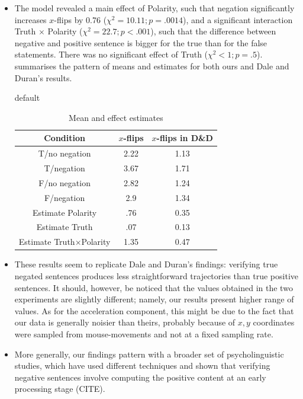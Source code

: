 \documentclass{article}
\begin{document}
\begin{itemize}
\item The model revealed a main effect of Polarity, such that negation significantly increases $x$-flips by 0.76 ($\chi^{2}=10.11; p=.0014$), and a significant interaction Truth $\times$ Polarity ($\chi^{2}=22.7; p<.001$), such that the difference between negative and positive sentence is bigger for the true than for the false statements. There was no significant effect of Truth ($\chi^{2}<1; p=.5$). 
 summarises the pattern of means and estimates for both ours and Dale and Duran's results. 

\begin{table}[h]
\caption{default}
\begin{center}
\begin{tabular}{ccc}
Condition & $x$-flips &  $x$-flips in D\&D \\
\hline
T/no negation & 2.22 & 1.13 \\
T/negation & 3.67 & 1.71 \\
F/no negation & 2.82 & 1.24 \\
F/negation & 2.9 & 1.34 \\
Estimate Polarity & .76 & 0.35 \\
Estimate Truth & .07 & 0.13 \\
Estimate Truth$\times$Polarity & 1.35 & 0.47\\
\end{tabular}
\caption{Mean and effect estimates}
\label{table:negationresults}
\end{center}
\label{default}
\end{table}%

\item These results seem to replicate Dale and Duran's findings: verifying true negated sentences produces less straightforward trajectories than true positive sentences. It should, however, be noticed that the values obtained in the two experiments are slightly different; namely, our results present higher range of values. As for the acceleration component, this might be due to the fact that our data is generally noisier than theirs, probably because of $x,y$ coordinates were sampled from mouse-movements and not at a fixed sampling rate.

\item More generally, our findings pattern with a broader set of psycholinguistic studies, which have used different techniques and shown that verifying negative sentences involve computing the positive content at an early processing stage (CITE). 


\end{itemize}
\end{document}

